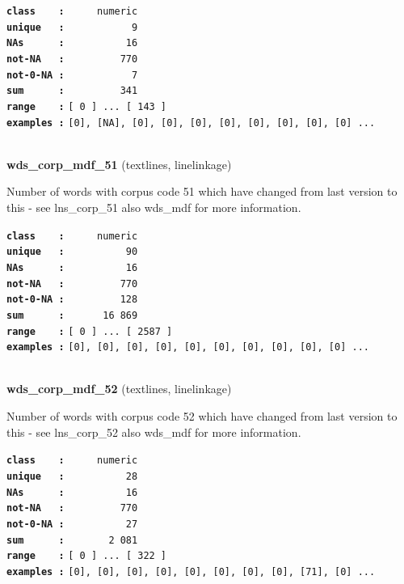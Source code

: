 \documentclass[]{article}
\begin{document}
\textbf{\texttt{class\ \ \ \ :}} \texttt{~~~~~numeric}\\
\textbf{\texttt{unique\ \ \ :}} \texttt{~~~~~~~~~~~9}\\
\textbf{\texttt{NAs\ \ \ \ \ \ :}} \texttt{~~~~~~~~~~16}\\
\textbf{\texttt{not-NA\ \ \ :}} \texttt{~~~~~~~~~770}\\
\textbf{\texttt{not-0-NA\ :}} \texttt{~~~~~~~~~~~7}\\
\textbf{\texttt{sum\ \ \ \ \ \ :}} \texttt{~~~~~~~~~341}\\
\textbf{\texttt{range\ \ \ \ :}}
\texttt{{[}\ 0\ {]}\ ...\ {[}\ 143\ {]}}\\
\textbf{\texttt{examples\ :}}
\texttt{{[}0{]},\ {[}NA{]},\ {[}0{]},\ {[}0{]},\ {[}0{]},\ {[}0{]},\ {[}0{]},\ {[}0{]},\ {[}0{]},\ {[}0{]}\ ...}\\

~

\textbf{wds\_corp\_mdf\_51} (textlines, linelinkage)

Number of words with corpus code 51 which have changed from last version
to this - see lns\_corp\_51 also wds\_mdf for more information.

\textbf{\texttt{class\ \ \ \ :}} \texttt{~~~~~numeric}\\
\textbf{\texttt{unique\ \ \ :}} \texttt{~~~~~~~~~~90}\\
\textbf{\texttt{NAs\ \ \ \ \ \ :}} \texttt{~~~~~~~~~~16}\\
\textbf{\texttt{not-NA\ \ \ :}} \texttt{~~~~~~~~~770}\\
\textbf{\texttt{not-0-NA\ :}} \texttt{~~~~~~~~~128}\\
\textbf{\texttt{sum\ \ \ \ \ \ :}} \texttt{~~~~~~16~869}\\
\textbf{\texttt{range\ \ \ \ :}}
\texttt{{[}\ 0\ {]}\ ...\ {[}\ 2587\ {]}}\\
\textbf{\texttt{examples\ :}}
\texttt{{[}0{]},\ {[}0{]},\ {[}0{]},\ {[}0{]},\ {[}0{]},\ {[}0{]},\ {[}0{]},\ {[}0{]},\ {[}0{]},\ {[}0{]}\ ...}\\

~

\textbf{wds\_corp\_mdf\_52} (textlines, linelinkage)

Number of words with corpus code 52 which have changed from last version
to this - see lns\_corp\_52 also wds\_mdf for more information.

\textbf{\texttt{class\ \ \ \ :}} \texttt{~~~~~numeric}\\
\textbf{\texttt{unique\ \ \ :}} \texttt{~~~~~~~~~~28}\\
\textbf{\texttt{NAs\ \ \ \ \ \ :}} \texttt{~~~~~~~~~~16}\\
\textbf{\texttt{not-NA\ \ \ :}} \texttt{~~~~~~~~~770}\\
\textbf{\texttt{not-0-NA\ :}} \texttt{~~~~~~~~~~27}\\
\textbf{\texttt{sum\ \ \ \ \ \ :}} \texttt{~~~~~~~2~081}\\
\textbf{\texttt{range\ \ \ \ :}}
\texttt{{[}\ 0\ {]}\ ...\ {[}\ 322\ {]}}\\
\textbf{\texttt{examples\ :}}
\texttt{{[}0{]},\ {[}0{]},\ {[}0{]},\ {[}0{]},\ {[}0{]},\ {[}0{]},\ {[}0{]},\ {[}0{]},\ {[}71{]},\ {[}0{]}\ ...}\\
\end{document}
